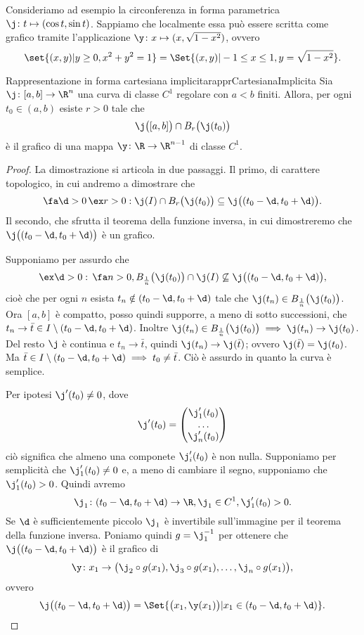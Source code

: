 Consideriamo ad esempio la circonferenza in forma parametrica \(\j\colon t\mapsto (\cos t,\sin t)\).
Sappiamo che localmente essa può essere scritta come grafico tramite l'applicazione \(\y\colon x \mapsto (x,\sqrt{1-x^2})\), ovvero
\[
	\set{(x,y) | y\ge 0, x^2+y^2 = 1} = \Set{(x,y) | -1\le x \le 1, y=\sqrt{1-x^2}}.
\]

\begin{teor}{Rappresentazione in forma cartesiana implicita}{rapprCartesianaImplicita}
	Sia \(\j\colon [a,b]\to \R^n\) una curva di classe \(C^1\) regolare con \(a<b\) finiti.
	Allora, per ogni \(t_0\in(a,b)\) esiste \(r>0\) tale che
	\[
		\j\big([a,b]\big) \cap B_r\big(\j(t_0)\big)
	\]
	è il grafico di una mappa \(\y\colon \R \to \R^{n-1}\) di classe \(C^1\).
\end{teor}

\begin{proof}
	La dimostrazione si articola in due passaggi. Il primo, di carattere topologico, in cui andremo a dimostrare che
	\[
		\fa \d>0\,\ex r>0 : \j(I) \cap B_r\big(\j(t_0)\big) \subseteq \j\big((t_0-\d,t_0+\d)\big).
	\]
	Il secondo, che sfrutta il teorema della funzione inversa, in cui dimostreremo che \(\j\big((t_0-\d,t_0+\d)\big)\) è un grafico.

	Supponiamo per assurdo che
	\[
		\ex \d>0:\,\fa n>0, B_{\frac{1}{n}}\big(\j(t_0)\big) \cap \j(I) \not\subseteq \j\big((t_0-\d,t_0+\d)\big),
	\]
	cioè che per ogni \(n\) esista \(t_n\notin (t_0-\d,t_0+\d)\) tale che \(\j(t_n)\in B_{\frac{1}{n}}\big(\j(t_0)\big)\).
	Ora \([a,b]\) è compatto, posso quindi supporre, a meno di sotto successioni, che \(t_n \to \bar{t}\in I\setminus(t_0-\d,t_0+\d)\).
	Inoltre \(\j(t_n)\in B_{\frac{1}{n}}\big(\j(t_0)\big)\implies \j(t_n) \to \j(t_0)\).
	Del resto \(\j\) è continua e \(t_n\to \bar{t}\), quindi \(\j(t_n)\to \j(\bar{t})\); ovvero \(\j(\bar{t})=\j(t_0)\).
	Ma \(\bar{t}\in I \setminus(t_0-\d,t_0+\d)\implies t_0\neq \bar{t}\).
	Ciò è assurdo in quanto la curva è semplice.

	Per ipotesi \(\j'(t_0)\neq 0\), dove
	\[
		\j'(t_0) = 	\begin{pmatrix}
			\j_1'(t_0) \\
			\dots      \\
			\j_n'(t_0)
		\end{pmatrix}
	\]
	ciò significa che almeno una componete \(\j_i'(t_0)\) è non nulla.
	Supponiamo per semplicità che \(\j_1'(t_0)\neq 0\) e, a meno di cambiare il segno, supponiamo che \(\j_1'(t_0)>0\).
	Quindi avremo
	\[
		\j_1\colon (t_0-\d,t_0+\d) \to \R, \j_1 \in C^1, \j_1'(t_0)>0.
	\]
	Se \(\d\) è sufficientemente piccolo \(\j_1\) è invertibile sull'immagine per il teorema della funzione inversa.
	Poniamo quindi \(g=\j_1^{-1}\) per ottenere che \(\j\big((t_0-\d,t_0+\d)\big)\) è il grafico di
	\[
		\y\colon x_1 \to \big(\j_2 \circ g(x_1),\j_3 \circ g(x_1),\ldots, \j_n \circ g(x_1)\big),
	\]
	ovvero
	\[
		\j\big((t_0-\d,t_0+\d)\big) = \Set{\big(x_1,\y(x_1)\big) | x_1 \in (t_0-\d,t_0+\d)}.\qedhere
	\]
\end{proof}

